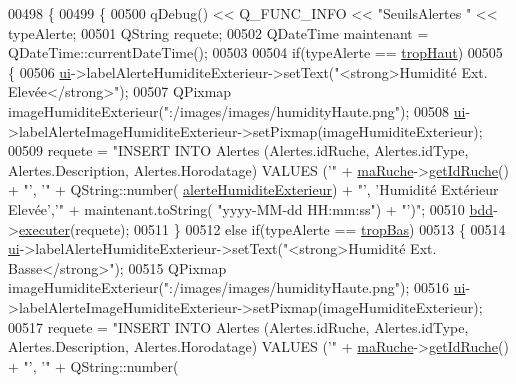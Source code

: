 \begin{DoxyCode}
00498 \{
00499     \{
00500         qDebug() << Q\_FUNC\_INFO << \textcolor{stringliteral}{"SeuilsAlertes "} << typeAlerte;
00501         QString requete;
00502         QDateTime maintenant = QDateTime::currentDateTime();
00503 
00504         \textcolor{keywordflow}{if}(typeAlerte == \hyperlink{parametres_8h_aaa6de8207c94675264c90b10b613368dabc650d9700ae19f2696e6a6e3f9ab067}{tropHaut})
00505          \{
00506             \hyperlink{class_ruche_ihm_a64786058bd7f88ca2f1e9743bb27c25b}{ui}->labelAlerteHumiditeExterieur->setText(\textcolor{stringliteral}{"<strong>Humidité Ext. Elevée</strong>"});
00507             QPixmap imageHumiditeExterieur(\textcolor{stringliteral}{":/images/images/humidityHaute.png"});
00508             \hyperlink{class_ruche_ihm_a64786058bd7f88ca2f1e9743bb27c25b}{ui}->labelAlerteImageHumiditeExterieur->setPixmap(imageHumiditeExterieur);
00509             requete = \textcolor{stringliteral}{"INSERT INTO Alertes (Alertes.idRuche, Alertes.idType, Alertes.Description,
       Alertes.Horodatage) VALUES ('"} + \hyperlink{class_ruche_ihm_a43a6b1fa31f4fba58d919daae3707b38}{maRuche}->\hyperlink{class_ruche_a9f2de5ef29557ec7a53d5e22df34d164}{getIdRuche}() + \textcolor{stringliteral}{"', '"} + QString::number(
      \hyperlink{parametres_8h_a83a725fd153179a2bd97afcc8307737bacda66fabe33c8c197f8ff098a952fca3}{alerteHumiditeExterieur}) + \textcolor{stringliteral}{"', 'Humidité Extérieur Elevée','"} + maintenant.toString(\textcolor{stringliteral}{
      "yyyy-MM-dd  HH:mm:ss"}) + \textcolor{stringliteral}{"')"};
00510             \hyperlink{class_ruche_ihm_a0851936fe212e8d40538264f09749153}{bdd}->\hyperlink{class_base_de_donnees_aa8de5f8f8bb17edc43f5c0ee33712081}{executer}(requete);
00511          \}
00512          \textcolor{keywordflow}{else} \textcolor{keywordflow}{if}(typeAlerte == \hyperlink{parametres_8h_aaa6de8207c94675264c90b10b613368da4257e2f8921856770c8266f55c937295}{tropBas})
00513          \{
00514             \hyperlink{class_ruche_ihm_a64786058bd7f88ca2f1e9743bb27c25b}{ui}->labelAlerteHumiditeExterieur->setText(\textcolor{stringliteral}{"<strong>Humidité Ext. Basse</strong>"});
00515             QPixmap imageHumiditeExterieur(\textcolor{stringliteral}{":/images/images/humidityHaute.png"});
00516             \hyperlink{class_ruche_ihm_a64786058bd7f88ca2f1e9743bb27c25b}{ui}->labelAlerteImageHumiditeExterieur->setPixmap(imageHumiditeExterieur);
00517             requete = \textcolor{stringliteral}{"INSERT INTO Alertes (Alertes.idRuche, Alertes.idType, Alertes.Description,
       Alertes.Horodatage) VALUES ('"} + \hyperlink{class_ruche_ihm_a43a6b1fa31f4fba58d919daae3707b38}{maRuche}->\hyperlink{class_ruche_a9f2de5ef29557ec7a53d5e22df34d164}{getIdRuche}() + \textcolor{stringliteral}{"', '"} + QString::number(

\end{DoxyCode}
